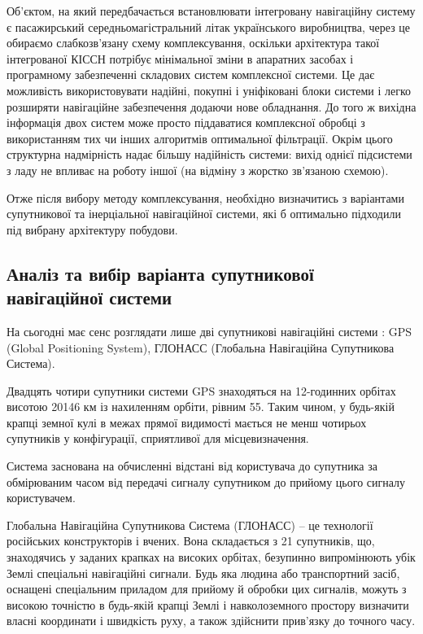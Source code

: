 Об'єктом, на який передбачається встановлювати інтегровану навігаційну систему є пасажирський середньомагістральний літак українського виробництва, через це обираємо  слабкозв’язану схему комплексування, оскільки архітектура такої інтегрованої КІССН потрібує мінімальної зміни в апаратних засобах і програмному забезпеченні складових систем комплексної системи. Це дає можливість використовувати надійні, покупні і уніфіковані блоки системи і легко розширяти навігаційне забезпечення додаючи нове обладнання. До того ж вихідна інформація двох систем може просто піддаватися комплексної обробці з використанням тих чи інших алгоритмів оптимальної фільтрації. Окрім цього структурна надмірність надає більшу надійність системи: вихід однієї підсистеми з ладу не впливає на роботу іншої (на відміну з жорстко зв’язаною схемою).

Отже після вибору методу комплексування, необхідно визначитись з варіантами супутникової та інерціальної навігаційної системи, які б оптимально підходили під вибрану архітектуру побудови.


\subsection{Аналіз та вибір варіанта супутникової навігаційної системи}

На сьогодні має сенс розглядати лише дві супутникові навігаційні системи : GPS (Global Positioning System), 
ГЛОНАСС (Глобальна Навігаційна Супутникова Система).

Двадцять чотири супутники системи GPS знаходяться на 12-годинних орбітах висотою 
20146 км із нахиленням орбіти, рівним 55. Таким чином, 
у будь-якій крапці земної кулі в межах прямої видимості мається не менш чотирьох супутників 
у конфігурації, сприятливої для місцевизначення.

Система заснована на обчисленні відстані від користувача до супутника за обмірюваним часом 
від передачі сигналу супутником до прийому цього сигналу користувачем.

Глобальна Навігаційна Супутникова Система (ГЛОНАСС) -- це технології російських конструкторів і вчених.
Вона складається 
з 21 супутників, що, знаходячись у заданих крапках на високих орбітах, безупинно випромінюють 
убік Землі спеціальні навігаційні сигнали. Будь яка людина або транспортний засіб, оснащені 
спеціальним приладом для прийому й обробки цих сигналів, можуть з високою точністю в 
будь-якій крапці Землі і навколоземного простору визначити власні координати і швидкість 
руху, а також здійснити прив'язку до точного часу.

